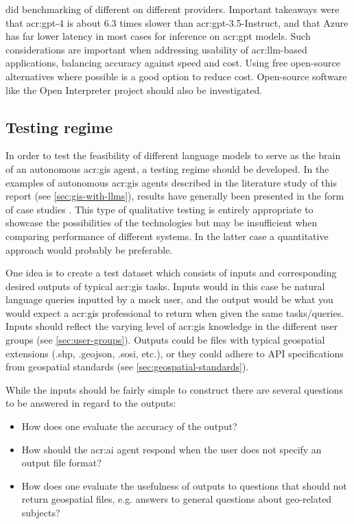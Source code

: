 \cite{clearyLatencyBenchmarksComparisons2023} did benchmarking of different  on different providers. Important takeaways were that \acrshort{acr:gpt}-4 is about 6.3 times slower than \acrshort{acr:gpt}-3.5-Instruct, and that Azure has far lower latency in most cases for inference on \acrshort{acr:gpt} models. Such considerations are important when addressing usability of \acrshort{acr:llm}-based applications, balancing accuracy against speed and cost. Using free open-source alternatives where possible is a good option to reduce cost. Open-source software like the Open Interpreter project should also be investigated.

\subsection{Testing regime}

In order to test the feasibility of different language models to serve as the brain of an autonomous \acrshort{acr:gis} agent, a testing regime should be developed. In the examples of autonomous \acrshort{acr:gis} agents described in the literature study of this report (see \autoref{sec:gis-with-llms}), results have generally been presented in the form of case studies \citep{liAutonomousGISNextgeneration2023,zhangGeoGPTUnderstandingProcessing2023}. This type of qualitative testing is entirely appropriate to showcase the possibilities of the technologies but may be insufficient when comparing performance of different systems. In the latter case a quantitative approach would probably be preferable.

One idea is to create a test dataset which consists of inputs and corresponding desired outputs of typical \acrshort{acr:gis} tasks. Inputs would in this case be natural language queries inputted by a mock user, and the output would be what you would expect a \acrshort{acr:gis} professional to return when given the same tasks/queries. Inputs should reflect the varying level of \acrshort{acr:gis} knowledge in the different user groups (see \autoref{sec:user-groups}). Outputs could be files with typical geospatial extensions (.shp, .geojson, .sosi, etc.), or they could adhere to API specifications from geospatial standards (see \autoref{sec:geospatial-standards}).

While the inputs should be fairly simple to construct there are several questions to be answered in regard to the outputs:

\begin{itemize}
    \item How does one evaluate the accuracy of the output?
    \item How should the \acrshort{acr:ai} agent respond when the user does not specify an output file format?
    \item How does one evaluate the usefulness of outputs to questions that should not return geospatial files, e.g. answers to general questions about geo-related subjects?
\end{itemize}

